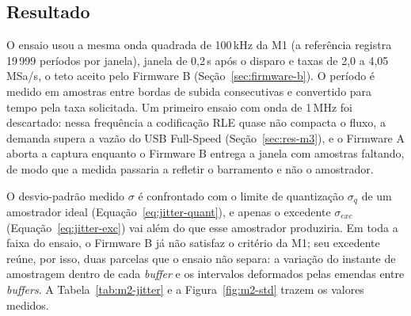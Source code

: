 \subsection{Resultado}

O ensaio usou a mesma onda quadrada de 100\,kHz da M1 (a referência
registra 19\,999 períodos por janela), janela de 0,2\,s após o disparo e
taxas de 2,0 a 4,05\,MSa/s, o teto aceito pelo Firmware B
(Seção~\ref{sec:firmware-b}). O período é medido
em amostras entre bordas de subida consecutivas e convertido para tempo pela
taxa solicitada. Um primeiro ensaio com onda de 1\,MHz foi descartado: nessa
frequência a codificação \ac{RLE} quase não compacta o fluxo, a demanda supera a
vazão do \ac{USB} Full-Speed (Seção~\ref{sec:res-m3}), e o Firmware A aborta a
captura enquanto o Firmware B entrega a janela com amostras faltando, de
modo que a medida passaria a refletir o barramento e não o amostrador.

O desvio-padrão medido $\sigma$ é confrontado com o limite de quantização
$\sigma_q$ de um amostrador ideal (Equação~\ref{eq:jitter-quant}), e apenas
o excedente $\sigma_{exc}$ (Equação~\ref{eq:jitter-exc}) vai além do que esse
amostrador produziria. Em toda a faixa do ensaio, o Firmware B já não
satisfaz o critério da M1; seu excedente reúne, por isso, duas parcelas que o
ensaio não separa: a variação do instante de amostragem dentro de cada
\emph{buffer} e os intervalos deformados pelas emendas entre \emph{buffers}.
A Tabela~\ref{tab:m2-jitter} e a
Figura~\ref{fig:m2-std} trazem os valores medidos.

